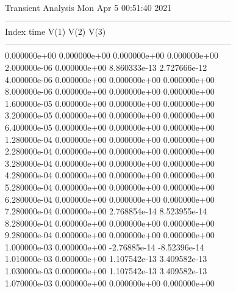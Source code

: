                                    Transient Analysis  Mon Apr  5 00:51:40  2021\\ \hline
--------------------------------------------------------------------------------\\ \hline
Index   time            V(1)            V(2)            V(3)            \\ \hline
--------------------------------------------------------------------------------\\ 	0.000000e+00	0.000000e+00	0.000000e+00	0.000000e+00	\\ 	2.000000e-06	0.000000e+00	8.860333e-13	2.727666e-12	\\ 	4.000000e-06	0.000000e+00	0.000000e+00	0.000000e+00	\\ 	8.000000e-06	0.000000e+00	0.000000e+00	0.000000e+00	\\ 	1.600000e-05	0.000000e+00	0.000000e+00	0.000000e+00	\\ 	3.200000e-05	0.000000e+00	0.000000e+00	0.000000e+00	\\ 	6.400000e-05	0.000000e+00	0.000000e+00	0.000000e+00	\\ 	1.280000e-04	0.000000e+00	0.000000e+00	0.000000e+00	\\ 	2.280000e-04	0.000000e+00	0.000000e+00	0.000000e+00	\\ 	3.280000e-04	0.000000e+00	0.000000e+00	0.000000e+00	\\ 	4.280000e-04	0.000000e+00	0.000000e+00	0.000000e+00	\\ 	5.280000e-04	0.000000e+00	0.000000e+00	0.000000e+00	\\ 	6.280000e-04	0.000000e+00	0.000000e+00	0.000000e+00	\\ 	7.280000e-04	0.000000e+00	2.768854e-14	8.523955e-14	\\ 	8.280000e-04	0.000000e+00	0.000000e+00	0.000000e+00	\\ 	9.280000e-04	0.000000e+00	0.000000e+00	0.000000e+00	\\ 	1.000000e-03	0.000000e+00	-2.76885e-14	-8.52396e-14	\\ 	1.010000e-03	0.000000e+00	1.107542e-13	3.409582e-13	\\ 	1.030000e-03	0.000000e+00	1.107542e-13	3.409582e-13	\\ 	1.070000e-03	0.000000e+00	0.000000e+00	0.000000e+00	\\ \hline
